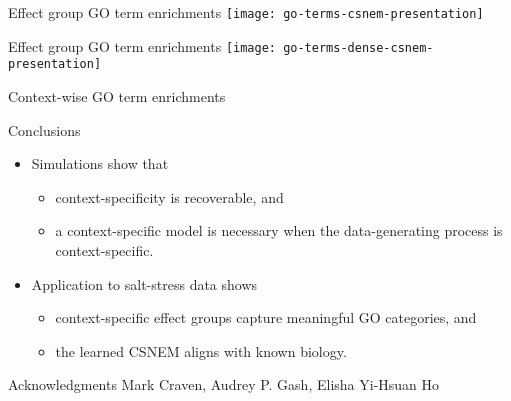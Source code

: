 \documentclass[aspectratio=169]{beamer}
\begin{document}

\begin{frame}{Effect group GO term enrichments}
\centering
\texttt{[image: go-terms-csnem-presentation]}
\end{frame}

\begin{frame}{Effect group GO term enrichments}
\centering
\texttt{[image: go-terms-dense-csnem-presentation]}
\end{frame}



\begin{frame}{Context-wise GO term enrichments}
\centering
\end{frame}


\begin{frame}{Conclusions}
 \begin{itemize}
  \item Simulations show that
  \begin{itemize}
   \item context-specificity is recoverable, and
   \item a context-specific model is necessary when the data-generating process is context-specific.
  \end{itemize}
  \item Application to salt-stress data shows
  \begin{itemize}
   \item context-specific effect groups capture meaningful GO categories, and
   \item the learned CSNEM aligns with known biology.
  \end{itemize}
 \end{itemize}
 \pause
 \begin{block}{Acknowledgments}
   Mark Craven, Audrey P. Gash, Elisha Yi-Hsuan Ho %
 \end{block}
\end{frame}

\end{document}
